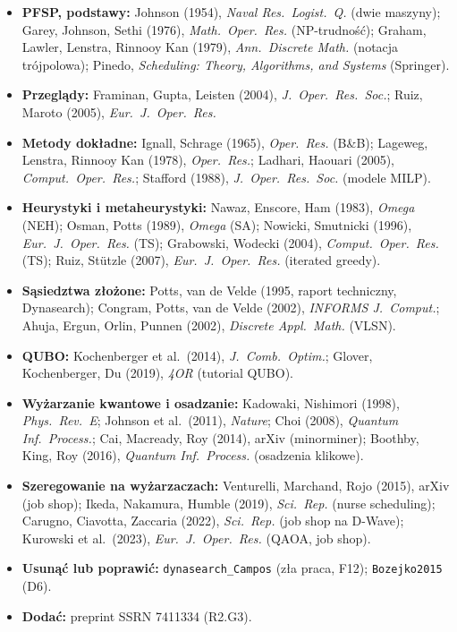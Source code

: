 \documentclass[11pt,a4paper]{article}
\begin{document}
\begin{itemize}
\item \textbf{PFSP, podstawy:} Johnson (1954), \emph{Naval Res.\ Logist.\ Q.} (dwie maszyny); Garey, Johnson, Sethi (1976), \emph{Math.\ Oper.\ Res.} (NP-trudność); Graham, Lawler, Lenstra, Rinnooy Kan (1979), \emph{Ann.\ Discrete Math.} (notacja trójpolowa); Pinedo, \emph{Scheduling: Theory, Algorithms, and Systems} (Springer).
\item \textbf{Przeglądy:} Framinan, Gupta, Leisten (2004), \emph{J.\ Oper.\ Res.\ Soc.}; Ruiz, Maroto (2005), \emph{Eur.\ J.\ Oper.\ Res.}
\item \textbf{Metody dokładne:} Ignall, Schrage (1965), \emph{Oper.\ Res.} (B\&B); Lageweg, Lenstra, Rinnooy Kan (1978), \emph{Oper.\ Res.}; Ladhari, Haouari (2005), \emph{Comput.\ Oper.\ Res.}; Stafford (1988), \emph{J.\ Oper.\ Res.\ Soc.} (modele MILP).
\item \textbf{Heurystyki i metaheurystyki:} Nawaz, Enscore, Ham (1983), \emph{Omega} (NEH); Osman, Potts (1989), \emph{Omega} (SA); Nowicki, Smutnicki (1996), \emph{Eur.\ J.\ Oper.\ Res.} (TS); Grabowski, Wodecki (2004), \emph{Comput.\ Oper.\ Res.} (TS); Ruiz, Stützle (2007), \emph{Eur.\ J.\ Oper.\ Res.} (iterated greedy).
\item \textbf{Sąsiedztwa złożone:} Potts, van de Velde (1995, raport techniczny, Dynasearch); Congram, Potts, van de Velde (2002), \emph{INFORMS J.\ Comput.}; Ahuja, Ergun, Orlin, Punnen (2002), \emph{Discrete Appl.\ Math.} (VLSN).
\item \textbf{QUBO:} Kochenberger et al.\ (2014), \emph{J.\ Comb.\ Optim.}; Glover, Kochenberger, Du (2019), \emph{4OR} (tutorial QUBO).
\item \textbf{Wyżarzanie kwantowe i osadzanie:} Kadowaki, Nishimori (1998), \emph{Phys.\ Rev.\ E}; Johnson et al.\ (2011), \emph{Nature}; Choi (2008), \emph{Quantum Inf.\ Process.}; Cai, Macready, Roy (2014), arXiv (minorminer); Boothby, King, Roy (2016), \emph{Quantum Inf.\ Process.} (osadzenia klikowe).
\item \textbf{Szeregowanie na wyżarzaczach:} Venturelli, Marchand, Rojo (2015), arXiv (job shop); Ikeda, Nakamura, Humble (2019), \emph{Sci.\ Rep.} (nurse scheduling); Carugno, Ciavotta, Zaccaria (2022), \emph{Sci.\ Rep.} (job shop na D-Wave); Kurowski et al.\ (2023), \emph{Eur.\ J.\ Oper.\ Res.} (QAOA, job shop).
\item \textbf{Usunąć lub poprawić:} \texttt{dynasearch\_Campos} (zła praca, F12); \texttt{Bozejko2015} (D6).
\item \textbf{Dodać:} preprint SSRN 7411334 (R2.G3).
\end{itemize}
\end{document}
